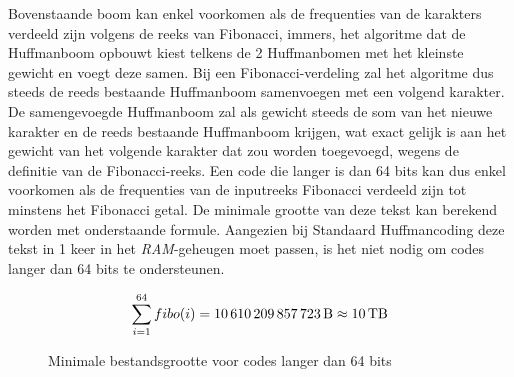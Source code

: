 \noindent Bovenstaande boom kan enkel voorkomen als de frequenties van de karakters verdeeld zijn volgens de reeks van Fibonacci, immers, het algoritme dat de Huffmanboom opbouwt kiest telkens de 2 Huffmanbomen met het kleinste gewicht en voegt deze samen. Bij een Fibonacci-verdeling zal het algoritme dus steeds de reeds bestaande Huffmanboom samenvoegen met een volgend karakter. De samengevoegde Huffmanboom zal als gewicht steeds de som van het nieuwe karakter en de reeds bestaande Huffmanboom krijgen, wat exact gelijk is aan het gewicht van het volgende karakter dat zou worden toegevoegd, wegens de definitie van de Fibonacci-reeks. Een code die langer is dan 64 bits kan dus enkel voorkomen als de frequenties van de inputreeks Fibonacci verdeeld zijn tot minstens het  Fibonacci getal. De minimale grootte van deze tekst kan berekend worden met onderstaande formule. Aangezien bij Standaard Huffmancoding deze tekst in 1 keer in het \emph{RAM}-geheugen moet passen, is het niet nodig om codes langer dan 64 bits te ondersteunen.
\begin{figure}[h]
	$$\sum_{i=1}^{64} fibo(i) = \text{\SI{10610209857723}{\byte}} \approx \SI{10}{\tera\byte}$$
	\caption{Minimale bestandsgrootte voor codes langer dan 64 bits}
\end{figure}